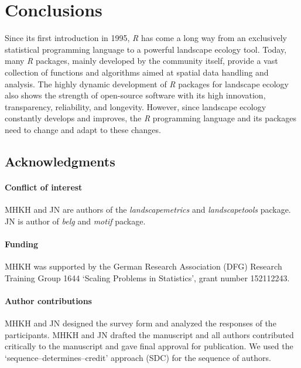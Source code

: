 \documentclass[smallextended]{svjour3}       %
\begin{document}
\hypertarget{conclusions}{%
\section{Conclusions}\label{conclusions}}

Since its first introduction in 1995, \emph{R} has come a long way from an exclusively statistical programming language to a powerful landscape ecology tool.
Today, many \emph{R} packages, mainly developed by the community itself, provide a vast collection of functions and algorithms aimed at spatial data handling and analysis.
The highly dynamic development of \emph{R} packages for landscape ecology also shows the strength of open-source software with its high innovation, transparency, reliability, and longevity.
However, since landscape ecology constantly develops and improves, the \emph{R} programming language and its packages need to change and adapt to these changes.

\hypertarget{acknowledgments}{%
\subsection{Acknowledgments}\label{acknowledgments}}

\hypertarget{conflict-of-interest}{%
\paragraph{Conflict of interest}\label{conflict-of-interest}}

MHKH and JN are authors of the \emph{landscapemetrics} and \emph{landscapetools} package.
JN is author of \emph{belg} and \emph{motif} package.

\hypertarget{funding}{%
\paragraph{Funding}\label{funding}}

MHKH was supported by the German Research Association (DFG) Research Training Group 1644 `Scaling Problems in Statistics', grant number 152112243.

\hypertarget{author-contributions}{%
\paragraph{Author contributions}\label{author-contributions}}

MHKH and JN designed the survey form and analyzed the responses of the participants.
MHKH and JN drafted the manuscript and all authors contributed critically to the manuscript and gave final approval for publication.
We used the `sequence--determines--credit' approach (SDC) for the sequence of authors.
\end{document}
